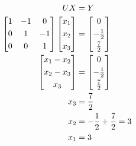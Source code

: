 	\begin{align}
		UX &= Y& \\
		\begin{bmatrix}
			1 & -1 & 0 \\[0.3em]
			0 & 1 & -1 \\[0.3em]
			0 & 0 & 1
		\end{bmatrix}
		\begin{bmatrix}
			x_{1} \\[0.3em]
			x_{2} \\[0.3em]
			x_{3}
		\end{bmatrix} &= \begin{bmatrix}
				0 \\[0.3em]
				-\frac{1}{2} \\[0.3em]
				\frac{7}{2}
			\end{bmatrix}& \notag \\
		\begin{bmatrix}
			x_{1} - x_{2} \\[0.3em]
			x_{2} - x_{3} \\[0.3em]
			x_{3}
		\end{bmatrix} &= \begin{bmatrix}
				0 \\[0.3em]
				-\frac{1}{2} \\[0.3em]
				\frac{7}{2}
			\end{bmatrix}& \notag \\
		x_{3} &= \frac{7}{2}& \\
		x_{2} &= -\frac{1}{2} + \frac{7}{2} = 3& \\
		x_{1} &= 3
	\label{eq:52x}
	\end{align}